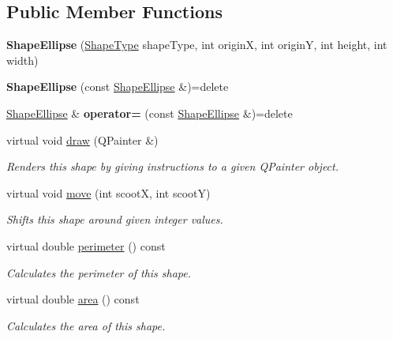 \subsection*{Public Member Functions}
\begin{DoxyCompactItemize}
\item 
\mbox{\label{class_shape_ellipse_a80f7ee6f65112d606b348d89366feeee}} 
{\bfseries Shape\+Ellipse} (\mbox{\hyperlink{class_i_shape_a8f50993477b5ddb44c0547ef3d547cdc}{Shape\+Type}} shape\+Type, int originX, int originY, int height, int width)
\item 
\mbox{\label{class_shape_ellipse_a681b89e97838504d2c7f6c1771055b2e}} 
{\bfseries Shape\+Ellipse} (const \mbox{\hyperlink{class_shape_ellipse}{Shape\+Ellipse}} \&)=delete
\item 
\mbox{\label{class_shape_ellipse_ad9859459d9f53eac418601c054cf3289}} 
\mbox{\hyperlink{class_shape_ellipse}{Shape\+Ellipse}} \& {\bfseries operator=} (const \mbox{\hyperlink{class_shape_ellipse}{Shape\+Ellipse}} \&)=delete
\item 
virtual void \mbox{\hyperlink{class_shape_ellipse_ac7f0a33cb5a88c6956f2d876c0c5d313}{draw}} (Q\+Painter \&)
\begin{DoxyCompactList}\small\item\em Renders this shape by giving instructions to a given Q\+Painter object. \end{DoxyCompactList}\item 
virtual void \mbox{\hyperlink{class_shape_ellipse_a07ce6783744d01ccebbd5c2c8b4c7d9b}{move}} (int scootX, int scootY)
\begin{DoxyCompactList}\small\item\em Shifts this shape around given integer values. \end{DoxyCompactList}\item 
virtual double \mbox{\hyperlink{class_shape_ellipse_a397c01c912105854e065f6c2d766f73a}{perimeter}} () const
\begin{DoxyCompactList}\small\item\em Calculates the perimeter of this shape. \end{DoxyCompactList}\item 
virtual double \mbox{\hyperlink{class_shape_ellipse_a08287b301b7501eb941805eaf85fc00c}{area}} () const
\begin{DoxyCompactList}\small\item\em Calculates the area of this shape. \end{DoxyCompactList}\end{DoxyCompactItemize}
